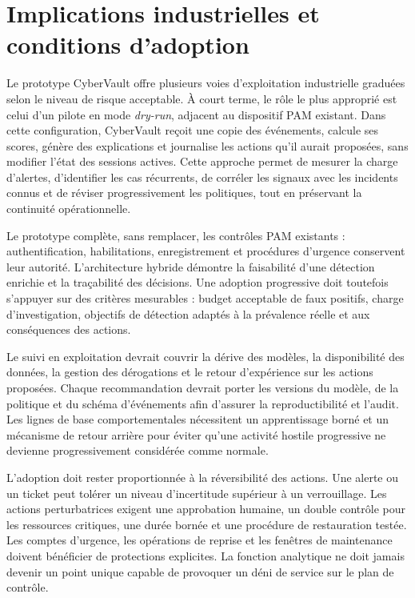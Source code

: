 \documentclass[11pt,a4paper,oneside]{report}
\theoremstyle{definition}
\theoremstyle{plain}
\begin{document}
\section{Implications industrielles et conditions d'adoption}
\label{sec:validation-industry}

Le prototype CyberVault offre plusieurs voies d'exploitation industrielle graduées selon le niveau de risque acceptable. À court terme, le rôle le plus approprié est celui d'un pilote en mode \emph{dry-run}, adjacent au dispositif PAM existant. Dans cette configuration, CyberVault reçoit une copie des événements, calcule ses scores, génère des explications et journalise les actions qu'il aurait proposées, sans modifier l'état des sessions actives. Cette approche permet de mesurer la charge d'alertes, d'identifier les cas récurrents, de corréler les signaux avec les incidents connus et de réviser progressivement les politiques, tout en préservant la continuité opérationnelle.

Le prototype complète, sans remplacer, les contrôles PAM existants : authentification, habilitations, enregistrement et procédures d'urgence conservent leur autorité. L'architecture hybride démontre la faisabilité d'une détection enrichie et la traçabilité des décisions. Une adoption progressive doit toutefois s'appuyer sur des critères mesurables : budget acceptable de faux positifs, charge d'investigation, objectifs de détection adaptés à la prévalence réelle et aux conséquences des actions.

Le suivi en exploitation devrait couvrir la dérive des modèles, la disponibilité des données, la gestion des dérogations et le retour d'expérience sur les actions proposées. Chaque recommandation devrait porter les versions du modèle, de la politique et du schéma d'événements afin d'assurer la reproductibilité et l'audit. Les lignes de base comportementales nécessitent un apprentissage borné et un mécanisme de retour arrière pour éviter qu'une activité hostile progressive ne devienne progressivement considérée comme normale.

L'adoption doit rester proportionnée à la réversibilité des actions. Une alerte ou un ticket peut tolérer un niveau d'incertitude supérieur à un verrouillage. Les actions perturbatrices exigent une approbation humaine, un double contrôle pour les ressources critiques, une durée bornée et une procédure de restauration testée. Les comptes d'urgence, les opérations de reprise et les fenêtres de maintenance doivent bénéficier de protections explicites. La fonction analytique ne doit jamais devenir un point unique capable de provoquer un déni de service sur le plan de contrôle.
\end{document}
